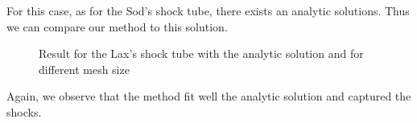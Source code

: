 \newpage
For this case, as for the Sod's shock tube, there exists an analytic solutions. Thus 
we can compare our method to this solution. 

\begin{figure}[H]
\hspace{-1.3cm}
\begin{minipage}{.5\linewidth}
\centering
{}
\end{minipage}
\hfill
\begin{minipage}{.5\linewidth}
\centering
{}
\end{minipage}
\vspace{0.5cm}
\hspace{-1.3cm}
\begin{minipage}{.5\linewidth}
\centering
{}
\end{minipage}
\hfill
\begin{minipage}{.5\linewidth}
\centering
{} 
\end{minipage}
\caption{Result for the Lax's shock tube with the analytic solution and for different mesh size}
\end{figure}

Again, we observe that the method fit well the analytic solution and captured the shocks. 




\newpage 

